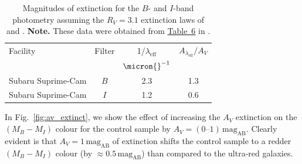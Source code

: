 \documentclass[a4paper, fleqn, usenatbib]{mnras}
\newcommand{\magab}{\text{mag}_{\text{AB}}}
\newcommand{\urgs}{ultra-red galaxies}
\begin{document}
\begin{table} 
    \centering
    \caption[Magnitude variation with $V$-band extinction]{Magnitudes of extinction for the $B\text{-}$ and $I\text{-}$band photometry assuming the $R_V = 3.1$ extinction laws of \citet{cardelli89} and \citet{odonnell94}. \textbf{Note.} These data were obtained from \href{http://iopscience.iop.org/article/10.1086/305772/fulltext/tb6.gif}{Table~6} in \citet{schlegel98}.}
    \label{tab:av_extinct}
    \begin{tabular}{l c c c}
        \hline
        Facility & Filter & 1/$\lambda_{\text{eff}}$ & $A_{\lambda_{\text{eff}}}/A_V$ \\
         &  & $\micron{}^{-1}$ & \\
        \hline
        Subaru Suprime-Cam & $B$ & 2.3 & 1.3 \\
        Subaru Suprime-Cam & $I$ & 1.2 & 0.6 \\
        \hline
    \end{tabular}
\end{table}

In Fig.~\ref{fig:av_extinct}, we show the effect of increasing the $A_V$ extinction on the $(M_B-M_I)$ colour for the control sample by $A_V=(0\text{--}1)\,\magab{}$.
Clearly evident is that $A_V=1\,\magab{}$ of extinction shifts the control sample
to a redder $(M_B-M_I)$ colour (by $\approx0.5\,\magab{}$) than compared to the \urgs{}.
\end{document}
